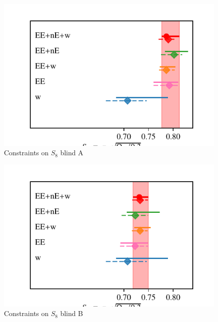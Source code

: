 \begin{figure}
	\begin{center}
		\includegraphics[width=\columnwidth]{Parameter_Plots/S8_comparison_blindA}
		\caption{Constraints on $S_{8}$ blind A}
		\label{fig:cosmology-params}
	\end{center}
\end{figure}

\begin{figure}
	\begin{center}
		\includegraphics[width=\columnwidth]{Parameter_Plots/S8_comparison_blindB}
		\caption{Constraints on $S_{8}$ blind B}
		\label{fig:cosmology-params}
	\end{center}
\end{figure}

